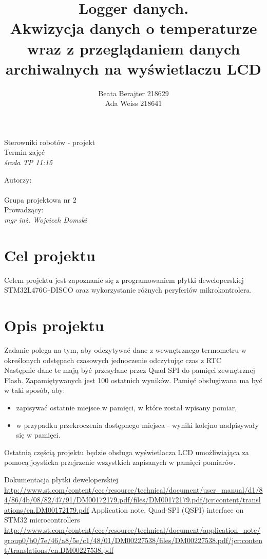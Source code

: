 \documentclass[a4paper,12pt]{article}
\author{Beata Berajter 218629\\
Ada Weiss 218641 }%
\title{Logger danych.\\Akwizycja danych o temperaturze wraz z przeglądaniem danych archiwalnych na wyświetlaczu LCD }
\makeatletter
\renewcommand{\maketitle}{\begin{titlepage}  
    \vspace*{1cm}
    \begin{center}
  Sterowniki robotów - projekt\\
Termin zajęć\\
\textit{środa TP 11:15}
    \end{center}
      \vspace{3cm}
    \begin{center}
     \LARGE \textsc {\@title}
         \end{center}
     \vspace{1cm}
    
    \begin{center}
    Autorzy:\\
   \textit{\@author} \\
\vspace{1cm}
Grupa projektowa nr 2\\
\vspace{2cm}
Prowadzący:\\
 \textit{mgr inż. Wojciech Domski}

     \end{center}
      \vspace{1cm}
    
    
    \vspace*{\stretch{6}}
    \begin{center}
    \@date
    \end{center}
  \end{titlepage}
}
\makeatother
\begin{document}
\newpage
\maketitle
\newpage
\tableofcontents

\newpage
\section{Cel projektu}
Celem projektu jest zapoznanie się z programowaniem płytki deweloperskiej STM32L476G-DISCO oraz wykorzystanie różnych peryferiów mikrokontrolera.
\section{Opis projektu}

Zadanie polega na tym, aby odczytywać dane z wewnętrznego termometru w określonych odstępach czasowych
jednoczenie odczytując czas z RTC\\
Następnie dane te mają być przesyłane przez Quad SPI do pamięci zewnętrznej Flash. Zapamiętywanych jest 100 ostatnich wyników. Pamięć obsługiwana ma być w taki sposób, aby:
\begin{itemize}
    \item zapisywać ostatnie miejsce w pamięci, w które został wpisany pomiar,
    \item w przypadku przekroczenia dostępnego miejsca - wyniki kolejno nadpisywały się w pamięci.
\end{itemize}

Ostatnią częścią projektu będzie obsługa wyświetlacza LCD umożliwiająca za pomocą joysticka przejrzenie wszystkich zapisanych w pamięci pomiarów.

\begin{thebibliography}{99}
 Dokumentacja płytki deweloperskiej 
\url {http://www.st.com/content/ccc/resource/technical/document/user_manual/d1/84/86/4b/08/82/47/91/DM00172179.pdf/files/DM00172179.pdf/jcr:content/translations/en.DM00172179.pdf}
 Application note. Quad-SPI (QSPI) interface on STM32 microcontrollers
\url {http://www.st.com/content/ccc/resource/technical/document/application_note/group0/b0/7e/46/a8/5e/c1/48/01/DM00227538/files/DM00227538.pdf/jcr:content/translations/en.DM00227538.pdf}

\end{thebibliography}
\end{document}
